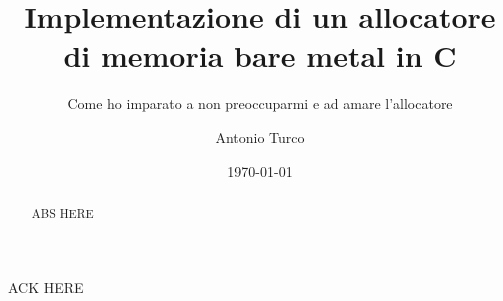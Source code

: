 \documentclass[noexaminfo,oneside,binding=0.6cm]{sapthesis}
\title{Implementazione di un allocatore di memoria bare metal in C}
\subtitle{Come ho imparato a non preoccuparmi e ad amare l'allocatore}
\author{Antonio Turco}
\date{\today}
\begin{document}
\frontmatter  
\maketitle
\dedication{Dedicato a...}

\begin{abstract}
  ABS HERE
\end{abstract}


\mainmatter 
\begin{acknowledgments}
  ACK HERE 
\end{acknowledgments}

\tableofcontents











\backmatter
\end{document}
